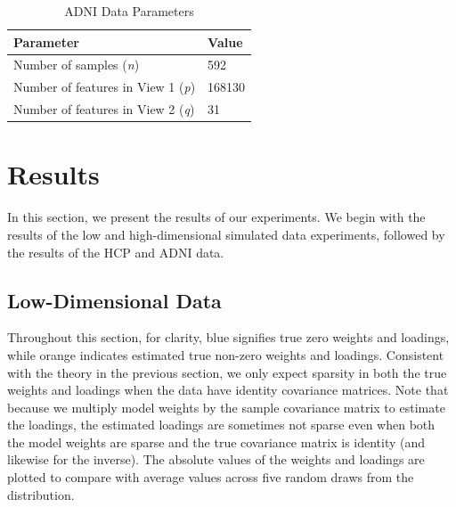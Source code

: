 \begin{table}
\centering
\caption{ADNI Data Parameters}
\begin{tabular}{| l | l |}
\hline
\textbf{Parameter} & \textbf{Value} \\
\hline
Number of samples (\textit{n}) & 592 \\
Number of features in View 1 (\textit{p}) & 168130 \\
Number of features in View 2 (\textit{q}) & 31 \\
\hline
\end{tabular}\label{tab:adni-parameters}
\end{table}

\section{Results}

In this section, we present the results of our experiments.
We begin with the results of the low and high-dimensional simulated data experiments, followed by the results of the HCP and ADNI data.

\subsection{Low-Dimensional Data}

Throughout this section, for clarity, blue signifies true zero weights and loadings, while orange indicates estimated true non-zero weights and loadings.
Consistent with the theory in the previous section, we only expect sparsity in both the true weights and loadings when the data have identity covariance matrices.
Note that because we multiply model weights by the sample covariance matrix to estimate the loadings, the estimated loadings are sometimes not sparse even when both the model weights are sparse and the true covariance matrix is identity (and likewise for the inverse).
The absolute values of the weights and loadings are plotted to compare with average values across five random draws from the distribution.

